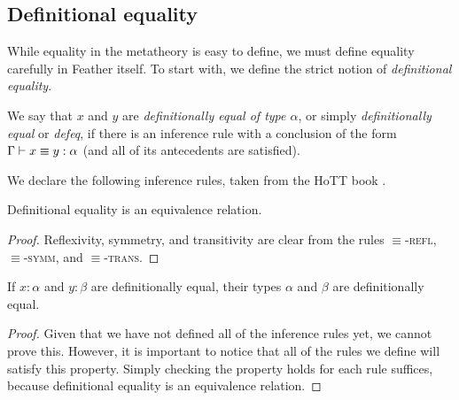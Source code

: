 \subsection{Definitional equality}
While equality in the metatheory is easy to define, we must define equality carefully in Feather itself.
To start with, we define the strict notion of \textit{definitional equality}.
\begin{defn}
	We say that \( x \) and \( y \) are \textit{definitionally equal of type \( \alpha \)}, or simply \textit{definitionally equal} or \textit{defeq}, if there is an inference rule with a conclusion of the form \( \Gamma \vdash x \equiv y : \alpha \) (and all of its antecedents are satisfied).
\end{defn}
We declare the following inference rules, taken from the HoTT book \cite{hottbook}.
\begin{lem}
	Definitional equality is an equivalence relation.
\end{lem}
\begin{proof}
	Reflexivity, symmetry, and transitivity are clear from the rules \( \equiv \)-\textsc{refl}, \( \equiv \)-\textsc{symm}, and \( \equiv \)-\textsc{trans}.
\end{proof}
\begin{lem}
	If \( x : \alpha \) and \( y : \beta \) are definitionally equal, their types \( \alpha \) and \( \beta \) are definitionally equal.
\end{lem}
\begin{proof}
	Given that we have not defined all of the inference rules yet, we cannot prove this.
	However, it is important to notice that all of the rules we define will satisfy this property.
	Simply checking the property holds for each rule suffices, because definitional equality is an equivalence relation.
\end{proof}
